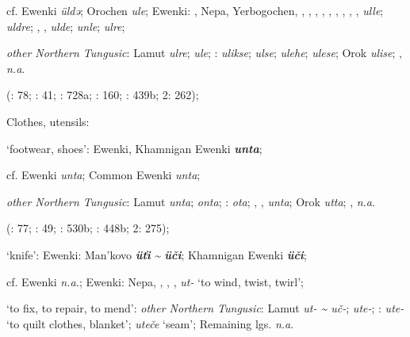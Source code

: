 \documentclass[output=paper,colorlinks,citecolor=brown]{langscibook}
\begin{document}
\begin{xlist}
\begin{xlist}
    cf.  Ewenki \textit{üldǝ}; Orochen \textit{ule};  Ewenki: , Nepa, Yerbogochen, , , , , , , , , ,  \textit{ulle};  \textit{uldre}; , ,  \textit{ulde};  \textit{unle};  \textit{ulre};

    \textit{other Northern Tungusic}: Lamut \textit{ulre};  \textit{ule}; \textit{}:  \textit{ulikse};  \textit{ulse};  \textit{ulehe};  \textit{ulese}; Orok \textit{ulise}; ,  \textit{n.a}.
    
    (\citealt{Castrén1856}: 78; \citealt{Janhunen1991}: 41; \citealt{Dorji1998}: 728a; \citealt{Chaoke2014a}: 160; \citealt{Vasilevic1958}: 439b; \citealt{Cincius1975B} 2: 262);

\end{xlist}

    \ex Clothes, utensils:

\begin{xlist}
    \ex ‘footwear, shoes’:  Ewenki, Khamnigan Ewenki \textbf{\textit{unta}};

    cf.  Ewenki \textit{unta};  Common Ewenki \textit{unta};

    \textit{other Northern Tungusic}: Lamut \textit{unta};  \textit{onta}; \textit{}:  \textit{ota}; , ,  \textit{unta}; Orok \textit{utta}; ,  \textit{n.a}.
    
    (\citealt{Castrén1856}: 77; \citealt{Janhunen1991}: 49; \citealt{Dorji1998}: 530b; \citealt{Vasilevic1958}: 448b; \citealt{Cincius1975B} 2: 275);

    \ex ‘knife’:  Ewenki: Man’kovo \textbf{\textit{üťi}} \textit{{\textasciitilde} \textbf{üči}}; Khamnigan Ewenki \textbf{\textit{üči}};

    cf.  Ewenki \textit{n.a.};  Ewenki: Nepa, , , ,  \textit{ut-} ‘to wind, twist, twirl’;

    ‘to fix, to repair, to mend’: \textit{other Northern Tungusic}: Lamut \textit{ut- {\textasciitilde} uč-};  \textit{ute-}; \textit{}:  \textit{ute-} ‘to quilt clothes, blanket’;  \textit{uteče} ‘seam’; Remaining lgs. \textit{n.a}. 
    

\end{xlist}
\end{xlist}
\end{document}
